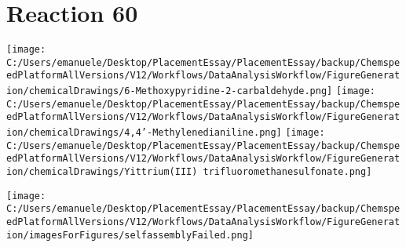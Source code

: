 \documentclass{article}%
\begin{document}
\section*{Reaction 60}%
%
\begin{scheme}[H]%
\begin{minipage}{0.5\textwidth}%
\texttt{[image: C:/Users/emanuele/Desktop/PlacementEssay/PlacementEssay/backup/ChemspeedPlatformAllVersions/V12/Workflows/DataAnalysisWorkflow/FigureGeneration/chemicalDrawings/6-Methoxypyridine-2-carbaldehyde.png]}%
\texttt{[image: C:/Users/emanuele/Desktop/PlacementEssay/PlacementEssay/backup/ChemspeedPlatformAllVersions/V12/Workflows/DataAnalysisWorkflow/FigureGeneration/chemicalDrawings/4,4'-Methylenedianiline.png]}%
\texttt{[image: C:/Users/emanuele/Desktop/PlacementEssay/PlacementEssay/backup/ChemspeedPlatformAllVersions/V12/Workflows/DataAnalysisWorkflow/FigureGeneration/chemicalDrawings/Yittrium(III) trifluoromethanesulfonate.png]}%
\end{minipage}%
\begin{minipage}{0.5\textwidth}%
\begin{center}%
\texttt{[image: C:/Users/emanuele/Desktop/PlacementEssay/PlacementEssay/backup/ChemspeedPlatformAllVersions/V12/Workflows/DataAnalysisWorkflow/FigureGeneration/imagesForFigures/selfassemblyFailed.png]}%
\end{center}%
\end{minipage}%
\caption{Self-assembly of components 6, 17, with Yittrium(III) in a 3.0:1.5:1.0 molar ratio in CH$_3$CN at 60\textdegree C for 40h. These are the reagents (starting materials) for reaction 60.}%
\end{scheme}%
\end{document}
